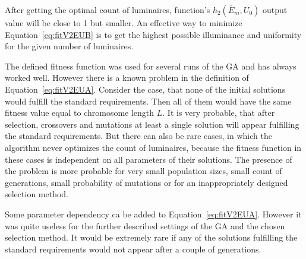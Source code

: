 After getting the optimal count of luminaires, function's $h_2\left(\overline{E}_{m}, U_0\right)$ output value will be close to 1 but smaller. An effective way to minimize Equation~\ref{eq:fitV2EUB} is to get the highest possible illuminance and uniformity for the given number of luminaires.

The defined fitness function was used for several runs of the GA and has always worked well. However there is a known problem in the definition of Equation~\ref{eq:fitV2EUA}. Consider the case, that none of the initial solutions would fulfill the standard requirements. Then all of them would have the same fitness value equal to chromosome length $L$. It is very probable, that after selection, crossovers and mutations at least a single solution will appear fulfilling the standard requirements. But there can also be rare cases, in which the algorithm never optimizes the count of luminaires, because the fitness function in these cases is independent on all parameters of their solutions. The presence of the problem is more probable for very small population sizes, small count of generations, small probability of mutations or for an inappropriately designed selection method.

Some parameter dependency ca be added to Equation~\ref{eq:fitV2EUA}. However it was quite useless for the further described settings of the GA and the chosen selection method. It would be extremely rare if any of the solutions fulfilling the standard requirements would not appear after a couple of generations.
